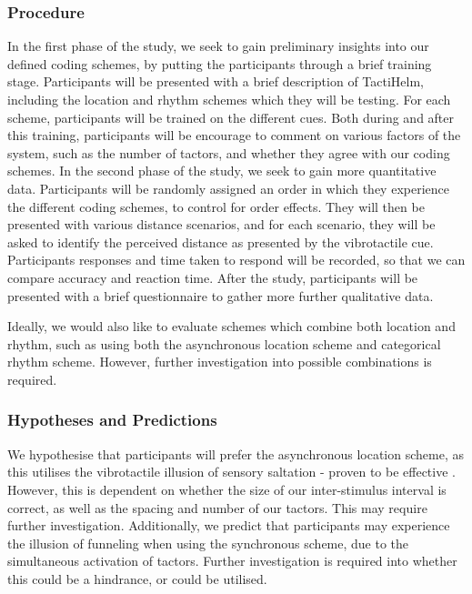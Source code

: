 \documentclass{interim}
\begin{document}
\subsubsection{Procedure}\label{sec:lab-procedure}
In the first phase of the study, we seek to gain preliminary insights into our defined coding schemes, by putting the participants through a brief training stage. Participants will be presented with a brief description of TactiHelm, including the location and rhythm schemes which they will be testing. For each scheme, participants will be trained on the different cues. Both during and after this training, participants will be encourage to comment on various factors of the system, such as the number of tactors, and whether they agree with our coding schemes. In the second phase of the study, we seek to gain more quantitative data. Participants will be randomly assigned an order in which they experience the different coding schemes, to control for order effects. They will then be presented with various distance scenarios, and for each scenario, they will be asked to identify the perceived distance as presented by the vibrotactile cue. Participants responses and time taken to respond will be recorded, so that we can compare accuracy and reaction time. After the study, participants will be presented with a brief questionnaire to gather more further qualitative data.

Ideally, we would also like to evaluate schemes which combine both location and rhythm, such as using both the asynchronous location scheme and categorical rhythm scheme. However, further investigation into possible combinations is required.

\subsubsection{Hypotheses and Predictions}\label{sec:predictions}
We hypothesise that participants will prefer the asynchronous location scheme, as this utilises the vibrotactile illusion of sensory saltation - proven to be effective \cite{5710913}. However, this is dependent on whether the size of our inter-stimulus interval is correct, as well as the spacing and number of our tactors. This may require further investigation. Additionally, we predict that participants may experience the illusion of funneling when using the synchronous scheme, due to the simultaneous activation of tactors. Further investigation is required into whether this could be a hindrance, or could be utilised.
\end{document}
